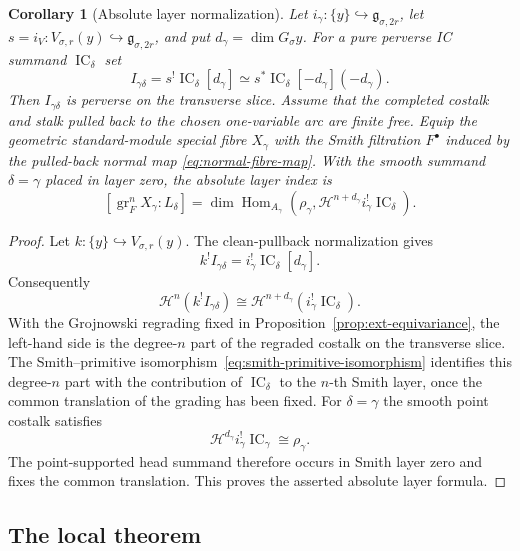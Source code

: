 \documentclass[10pt,a4paper]{amsart}
\newtheorem{corollary}[theorem]{Corollary}
\newcommand{\IC}{\operatorname{IC}}
\begin{document}
\begin{corollary}[Absolute layer normalization]
\label{cor:absolute-layer-normalization}
Let $i_\gamma:\{y\}\hookrightarrow\mathfrak g_{\sigma,2r}$, let
$s=i_V:V_{\sigma,r}(y)\hookrightarrow\mathfrak g_{\sigma,2r}$, and put
$d_\gamma=\dim G_\sigma y$.  For a pure perverse IC summand $\IC_\delta$ set
\[
 I_{\gamma\delta}=s^!\IC_\delta[d_\gamma]
 \simeq s^*\IC_\delta[-d_\gamma](-d_\gamma).
\]
Then $I_{\gamma\delta}$ is perverse on the transverse slice.  Assume that
the completed costalk and stalk pulled back to the chosen one-variable arc
are finite free.  Equip the geometric standard-module special fibre
$X_\gamma$ with the Smith filtration $F^\bullet$ induced by the pulled-back
normal map \eqref{eq:normal-fibre-map}.  With the smooth summand $\delta=\gamma$ placed in
layer zero, the absolute layer index is
\[
 [\operatorname{gr}_F^nX_\gamma:L_\delta]
 =\dim\operatorname{Hom}_{A_\gamma}\!\left(
   \rho_\gamma,
   \mathcal H^{n+d_\gamma}i_\gamma^!\IC_\delta
 \right).
\]
\end{corollary}

\begin{proof}
Let $k:\{y\}\hookrightarrow V_{\sigma,r}(y)$.  The clean-pullback
normalization gives
\[
k^!I_{\gamma\delta}=i_\gamma^!\IC_\delta[d_\gamma].
\]
Consequently
\[
 \mathcal H^n(k^!I_{\gamma\delta})
 \cong
 \mathcal H^{n+d_\gamma}(i_\gamma^!\IC_\delta).
\]
With the Grojnowski regrading fixed in
Proposition~\ref{prop:ext-equivariance}, the left-hand side is the
degree-$n$ part of the regraded costalk on the transverse slice.  The
Smith--primitive isomorphism~\eqref{eq:smith-primitive-isomorphism}
identifies this degree-$n$ part with the contribution of $\IC_\delta$ to
the $n$-th Smith layer, once the common translation of the grading has
been fixed.  For
$\delta=\gamma$ the smooth point costalk satisfies
\[
 \mathcal H^{d_\gamma}i_\gamma^!\IC_\gamma\cong\rho_\gamma.
\]
The point-supported head summand therefore occurs in Smith layer zero and
fixes the common translation.  This proves the asserted absolute layer
formula.
\end{proof}

\subsection{The local theorem}
\end{document}
